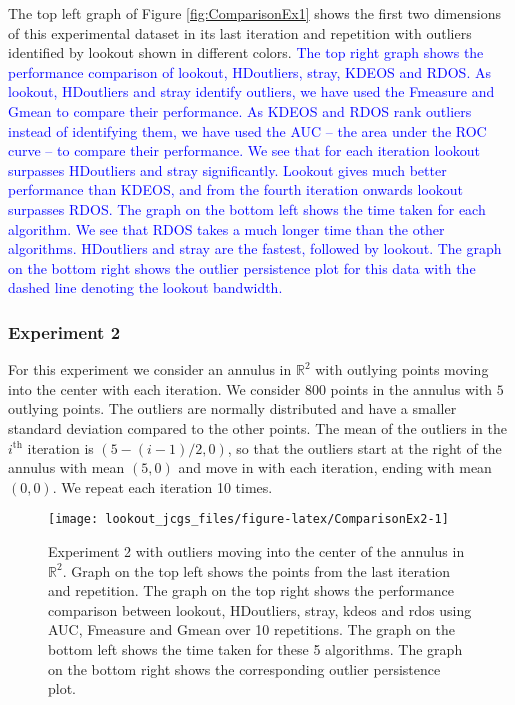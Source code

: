 \documentclass[12pt]{article}
\theoremstyle{definition}
\theoremstyle{definition}
\theoremstyle{definition}
\theoremstyle{remark}
\begin{document}
The top left graph of Figure \ref{fig:ComparisonEx1} shows the first two dimensions of this experimental dataset in its last iteration and repetition with outliers identified by lookout shown in different colors.
\textcolor{blue}{ The top right graph shows the performance comparison of lookout, HDoutliers, stray, KDEOS and RDOS. As lookout, HDoutliers and stray identify outliers, we have used the Fmeasure and Gmean to compare their performance. As KDEOS and RDOS rank outliers instead of identifying them, we have used the AUC -- the area under the ROC curve -- to compare their performance. We see that for each iteration lookout surpasses HDoutliers and stray significantly. Lookout gives much better performance than KDEOS, and from the fourth iteration onwards lookout surpasses RDOS. The graph on the bottom left shows the time taken for each algorithm. We see that RDOS takes a much longer time than the other algorithms. HDoutliers and stray are the fastest, followed by lookout. The graph on the bottom right shows the outlier persistence plot for this data with the dashed line denoting the lookout bandwidth.}

\hypertarget{experiment-2}{%
\subsubsection*{Experiment 2}\label{experiment-2}}

For this experiment we consider an annulus in \(\mathbb{R}^2\) with outlying points moving into the center with each iteration. We consider \(800\) points in the annulus with \(5\) outlying points. The outliers are normally distributed and have a smaller standard deviation compared to the other points. The mean of the outliers in the \(i^{\text{th}}\) iteration is \(\left( 5 - (i-1) /2, 0 \right)\), so that the outliers start at the right of the annulus with mean \((5,0)\) and move in with each iteration, ending with mean \((0,0)\). We repeat each iteration 10 times.

\begin{figure}
\texttt{[image: lookout\_jcgs\_files/figure-latex/ComparisonEx2-1]} \caption{Experiment 2 with outliers moving into the center of the annulus in $\mathbb{R}^2$. Graph on the top left shows the points from the last iteration and repetition. The graph on the top right shows the performance comparison between lookout, HDoutliers, stray, kdeos and rdos using AUC, Fmeasure and Gmean over 10 repetitions. The graph on the bottom left shows the time taken for these 5 algorithms. The graph on the bottom right shows the corresponding outlier persistence plot.}\label{fig:ComparisonEx2}
\end{figure}
\end{document}
